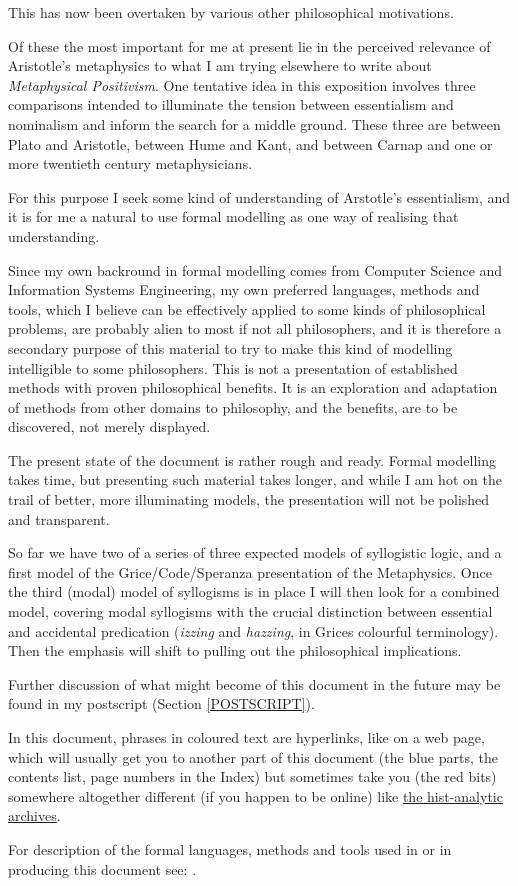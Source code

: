 \documentclass[11pt]{article}
\begin{document}
This has now been overtaken by various other philosophical motivations.

Of these the most important for me at present lie in the perceived relevance of Aristotle's metaphysics to what I am trying elsewhere to write about {\it Metaphysical Positivism}.
One tentative idea in this exposition involves three comparisons intended to illuminate the tension between essentialism and nominalism and inform the search for a middle ground.
These three are between Plato and Aristotle, between Hume and Kant, and between Carnap and one or more twentieth century metaphysicians.

For this purpose I seek some kind of understanding of Arstotle's essentialism, and it is for me a natural to use formal modelling as one way of realising that understanding.

Since my own backround in formal modelling comes from Computer Science and Information Systems Engineering, my own preferred languages, methods and tools, which I believe can be effectively applied to some kinds of philosophical problems, are probably alien to most if not all philosophers, and it is therefore a secondary purpose of this material to try to make this kind of modelling intelligible to some philosophers.
This is not a presentation of established methods with proven philosophical benefits.
It is an exploration and adaptation of methods from other domains to philosophy, and the benefits, are to be discovered, not merely displayed.

The present state of the document is rather rough and ready.
Formal modelling takes time, but presenting such material takes longer, and while I am hot on the trail of better, more illuminating models, the presentation will not be polished and transparent.

So far we have two of a series of three expected models of syllogistic logic, and a first model of the Grice/Code/Speranza presentation of the Metaphysics.
Once the third (modal) model of syllogisms is in place I will then look for a combined model, covering modal syllogisms with the crucial distinction between essential and accidental predication ({\it izzing} and {\it hazzing}, in Grices colourful terminology).
Then the emphasis will shift to pulling out the philosophical implications.

Further discussion of what might become of this document in the future may be found in my postscript (Section \ref{POSTSCRIPT}).

In this document, phrases in coloured text are hyperlinks, like on a web page, which will usually get you to another part of this document (the blue parts, the contents list, page numbers in the Index) but sometimes take you (the red bits) somewhere altogether different (if you happen to be online) like \href{http://rbjones.com/pipermail/hist-analytic_rbjones.com}{the hist-analytic archives}.

For description of the formal languages, methods and tools used in or in producing this document see: \cite{rbjt029}.
\end{document}
